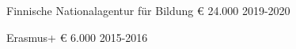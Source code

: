 \begin{cvhonors}

  \cvhonor
    {Finnische Nationalagentur für Bildung} %
    {} %
    {€ 24.000} %
    {2019-2020} %
    
  \cvhonor
    {Erasmus+} %
    {} %
    {€ 6.000} %
    {2015-2016} %

\end{cvhonors}
